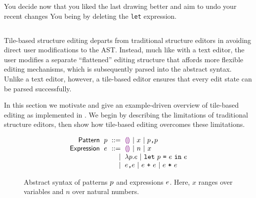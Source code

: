 You decide now that you liked the last drawing better
and aim to undo your recent changes
You being by deleting the \texttt{let} expression.


\subsection{}

Tile-based structure editing departs from traditional
structure editors in avoiding direct user modifications
to the AST.
Instead, much like with a text editor, the user modifies a separate
``flattened'' editing structure that affords more flexible
editing mechanisms, which is subsequently parsed into the
abstract syntax.
Unlike a text editor, however, a tile-based editor ensures
that every edit state can be parsed successfully.

In this section we motivate and give an example-driven
overview of tile-based editing as implemented
in \tylr. We begin by describing the limitations of
traditional structure editors, then show how tile-based
editing overcomes these limitations.

\begin{figure}
  \vspace{-3px}
  \[
  \arraycolsep=3pt\begin{array}{rlrl}
      \mathsf{Pattern} & \spat & ::= &
        \shole ~\vert~
        \svar{x} ~\vert~
        \sprod{\spat}{\spat}\\
      \mathsf{Expression} & \sexp & ::= &
        \shole ~\vert~
        \snumlit{n} ~\vert~
        \svar{x} \\
      & & \vert &
        \slam{\spat}{\sexp} ~\vert~
        \slet{\spat}{\sexp}{\sexp}\\
      & & \vert &
        \sprod{\sexp}{\sexp} ~\vert~
        \splus{\sexp}{\sexp} ~\vert~
        \smult{\sexp}{\sexp}
  \end{array}\]
  \caption{
    Abstract syntax of patterns $p$ and expressions $e$.
    Here,
      $x$ ranges over variables
      and $n$ over natural numbers.
  }
  \label{fig:language-syntax}
\end{figure}



